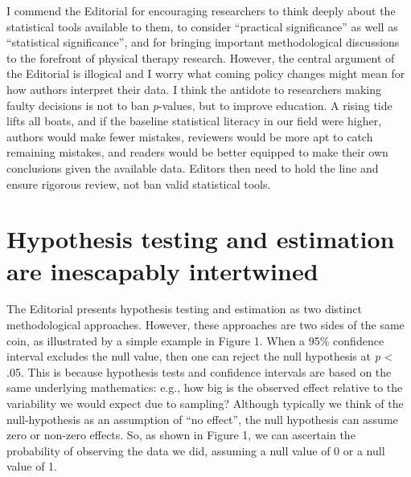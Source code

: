 \documentclass[]{cik}%
\begin{document}
I commend the Editorial for encouraging researchers to think deeply
about the statistical tools available to them, to consider ``practical
significance'' as well as ``statistical significance'', and for bringing
important methodological discussions to the forefront of physical
therapy research. However, the central argument of the Editorial is
illogical and I worry what coming policy changes might mean for how
authors interpret their data. I think the antidote to researchers making
faulty decisions is not to ban \emph{p}-values, but to improve
education. A rising tide lifts all boats, and if the baseline
statistical literacy in our field were higher, authors would make fewer
mistakes, reviewers would be more apt to catch remaining mistakes, and
readers would be better equipped to make their own conclusions given the
available data. Editors then need to hold the line and ensure rigorous
review, not ban valid statistical tools.

\hypertarget{hypothesis-testing-and-estimation-are-inescapably-intertwined}{%
\section{Hypothesis testing and estimation are inescapably
intertwined}\label{hypothesis-testing-and-estimation-are-inescapably-intertwined}}

The Editorial presents hypothesis testing and estimation as two distinct
methodological approaches. However, these approaches are two sides of
the same coin, as illustrated by a simple example in Figure 1. When a
95\% confidence interval excludes the null value, then one can reject
the null hypothesis at \emph{p} \textless{} .05. This is because
hypothesis tests and confidence intervals are based on the same
underlying mathematics: e.g., how big is the observed effect relative to
the variability we would expect due to sampling? Although typically we
think of the null-hypothesis as an assumption of ``no effect'', the null
hypothesis can assume zero or non-zero effects. So, as shown in Figure
1, we can ascertain the probability of observing the data we did,
assuming a null value of 0 or a null value of 1.
\end{document}
